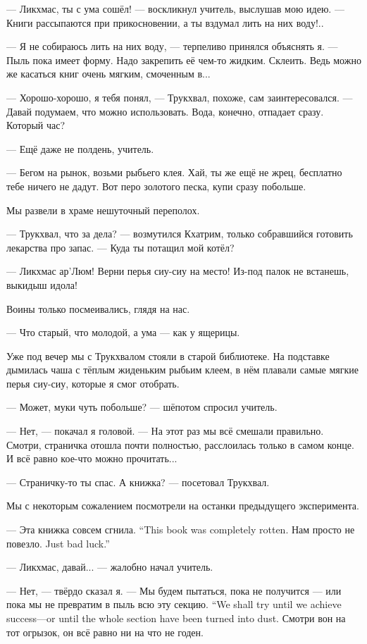 \asterism

--- Ликхмас, ты с ума сошёл! --- воскликнул учитель, выслушав мою идею.
--- Книги рассыпаются при прикосновении, а ты вздумал лить на них воду!..

--- Я не собираюсь лить на них воду, --- терпеливо принялся объяснять я.
--- Пыль пока имеет форму.
Надо закрепить её чем-то жидким.
Склеить.
Ведь можно же касаться книг очень мягким, смоченным в...

--- Хорошо-хорошо, я тебя понял, --- Трукхвал, похоже, сам заинтересовался.
--- Давай подумаем, что можно использовать.
Вода, конечно, отпадает сразу.
Который час?

--- Ещё даже не полдень, учитель.

--- Бегом на рынок, возьми рыбьего клея.
Хай, ты же ещё не жрец, бесплатно тебе ничего не дадут.
Вот перо золотого песка, купи сразу побольше.

Мы развели в храме нешуточный переполох.

--- Трукхвал, что за дела? --- возмутился Кхатрим, только собравшийся готовить лекарства про запас.
--- Куда ты потащил мой котёл?

--- Ликхмас ар’Люм!
Верни перья сиу-сиу на место!
Из-под палок не встанешь, выкидыш идола!

Воины только посмеивались, глядя на нас.

--- Что старый, что молодой, а ума --- как у ящерицы.

Уже под вечер мы с Трукхвалом стояли в старой библиотеке.
На подставке дымилась чаша с тёплым жиденьким рыбьим клеем, в нём плавали самые мягкие перья сиу-сиу, которые я смог отобрать.

--- Может, муки чуть побольше? --- шёпотом спросил учитель.

--- Нет, --- покачал я головой.
--- На этот раз мы всё смешали правильно.
Смотри, страничка отошла почти полностью, расслоилась только в самом конце.
И всё равно кое-что можно прочитать...

--- Страничку-то ты спас.
А книжка? --- посетовал Трукхвал.

Мы с некоторым сожалением посмотрели на останки предыдущего эксперимента.

{--- Эта книжка совсем сгнила.}
{``This book was completely rotten.}
{Нам просто не повезло.}
{Just bad luck.''}

--- Ликхмас, давай... --- жалобно начал учитель.

--- Нет, --- твёрдо сказал я.
{--- Мы будем пытаться, пока не получится --- или пока мы не превратим в пыль всю эту секцию.}
{``We shall try until we achieve success---or until the whole section have been turned into dust.}
Смотри вон на тот огрызок, он всё равно ни на что не годен.

